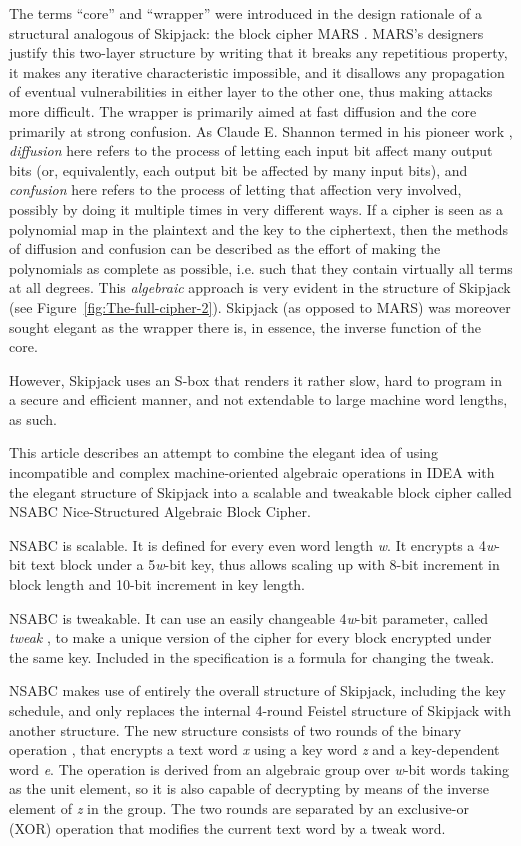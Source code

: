 \documentclass[a4paper,oneside,english]{amsart}
\numberwithin{equation}{section}
\numberwithin{figure}{section}
\begin{document}
The terms {}``core'' and {}``wrapper'' were introduced in the
design rationale of a structural analogous of Skipjack: the block
cipher MARS \cite{IBM98}. MARS's designers justify this two-layer
structure by writing that it breaks any repetitious property, it makes
any iterative characteristic impossible, and it disallows any propagation
of eventual vulnerabilities in either layer to the other one, thus
making attacks more difficult. The wrapper is primarily aimed at fast
diffusion and the core primarily at strong confusion. As Claude E.
Shannon termed in his pioneer work \cite{Sha49}, \emph{diffusion}
here refers to the process of letting each input bit affect many output
bits (or, equivalently, each output bit be affected by many input
bits), and \emph{confusion} here refers to the process of letting
that affection very involved, possibly by doing it multiple times
in very different ways. If a cipher is seen as a polynomial map in
the plaintext and the key to the ciphertext, then the methods of diffusion
and confusion can be described as the effort of making the polynomials
as complete as possible, i.e. such that they contain virtually all
terms at all degrees. This \emph{algebraic} approach is very evident
in the structure of Skipjack (see Figure~\ref{fig:The-full-cipher-2}).
Skipjack (as opposed to MARS) was moreover sought elegant as the wrapper
there is, in essence, the inverse function of the core.

However, Skipjack uses an S-box that renders it rather slow, hard
to program in a secure and efficient manner, and not extendable to
large machine word lengths, as such.

This article describes an attempt to combine the elegant idea of using
incompatible and complex machine-oriented algebraic operations in
IDEA with the elegant structure of Skipjack into a scalable and tweakable
block cipher called NSABC \textemdash{} Nice-Structured Algebraic
Block Cipher.

NSABC is scalable. It is defined for every even word length \emph{w}.
It encrypts a 4\emph{w}-bit text block under a 5\emph{w}-bit key,
thus allows scaling up with 8-bit increment in block length and 10-bit
increment in key length.

NSABC is tweakable. It can use an easily changeable 4\emph{w}-bit
parameter, called \emph{tweak} \cite{LRW02}, to make a unique version
of the cipher for every block encrypted under the same key. Included
in the specification is a formula for changing the tweak.

NSABC makes use of entirely the overall structure of Skipjack, including
the key schedule, and only replaces the internal 4-round Feistel structure
of Skipjack with another structure. The new structure consists of
two rounds of the binary operation ,
that encrypts a text word \emph{x} using a key word \emph{z} and a
key-dependent word \emph{e}. The operation 
is derived from an algebraic group over \emph{w}-bit words taking
 as the unit element, so it is also capable of decrypting by means
of the inverse element of \emph{z} in the group. The two rounds are
separated by an exclusive-or (XOR) operation that modifies the current
text word by a tweak word.
\end{document}
